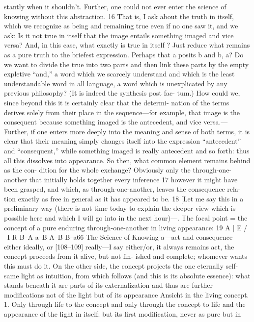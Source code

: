 stantly when it shouldn’t. Further, one could not ever enter the science of
knowing without this abstraction. 16 That is, I ask about the truth in itself,
which we recognize as being and remaining true even if no one saw it, and
we ask: Is it not true in itself that the image entails something imaged and
vice versa? And, in this case, what exactly is true in itself ? Just reduce what
remains as a pure truth to the briefest expression. Perhaps that a posits b and
b, a? Do we want to divide the true into two parts and then link these parts
by the empty expletive “and,” a word which we scarcely understand and
which is the least understandable word in all language, a word which is
unexplicated by any previous philosophy? (It is indeed the synthesis post fac-
tum.) How could we, since beyond this it is certainly clear that the determi-
nation of the terms derives solely from their place in the sequence—for
example, that image is the consequent because something imaged is the
antecedent, and vice versa.—Further, if one enters more deeply into the
meaning and sense of both terms, it is clear that their meaning simply
changes itself into the expression “antecedent” and “consequent,” while
something imaged is really antecedent and so forth: thus all this dissolves
into appearance. So then, what common element remains behind as the con-
dition for the whole exchange? Obviously only the through-one-another that
initially holds together every inference 17 however it might have been
grasped, and which, as through-one-another, leaves the consequence rela-
tion exactly as free in general as it has appeared to be. 18
[Let me say this in a preliminary way (there is not time today to explain
the deeper view which is possible here and which I will go into in the next
hour)—. The focal point = the concept of a pure enduring through-one-another
in living appearance: 19
A
|
E
/ \
I
R
B–A a–B
A–B B–a66
The Science of Knowing
a—act and consequence either ideally, or [108–109] really—I say
either/or, it always remains act, the concept proceeds from it alive, but not fin-
ished and complete; whomever wants this must do it.
On the other side, the concept projects the one eternally self-same light
as intuition, from which follows (and this is its absolute essence): what stands
beneath it are parts of its externalization and thus are further modifications
not of the light but of its appearance {Ansicht} in the living concept. 1. Only
through life to the concept and only through the concept to life and the
appearance of the light in itself: but its first modification, never as pure but in
